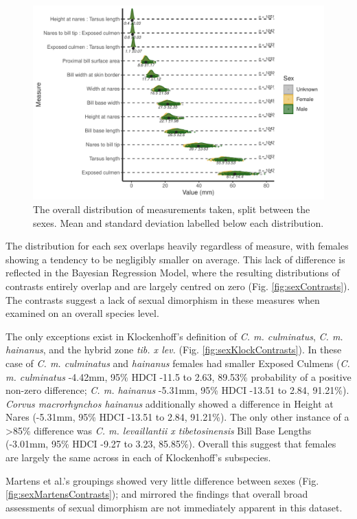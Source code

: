 \documentclass[10pt,a4paper]{article}
\begin{document}
\begin{figure}
\includegraphics[width=0.9\linewidth]{../Figures/OverallSummaryPlot} \caption{The overall distribution of measurements taken, split between the sexes. Mean and standard deviation labelled below each distribution.}\label{fig:overallPlot}
\end{figure}

The distribution for each sex overlaps heavily regardless of measure, with females showing a tendency to be negligibly smaller on average.
This lack of difference is reflected in the Bayesian Regression Model, where the resulting distributions of contrasts entirely overlap and are largely centred on zero (Fig. \ref{fig:sexContrasts}).
The contrasts suggest a lack of sexual dimorphism in these measures when examined on an overall species level.

The only exceptions exist in Klockenhoff's definition of \emph{C. m. culminatus}, \emph{C. m. hainanus}, and the hybrid zone \emph{tib. x lev.} (Fig. \ref{fig:sexKlockContrasts}).
In these case of \emph{C. m. culminatus} and \emph{hainanus} females had smaller Exposed Culmens (\emph{C. m. culminatus} -4.42mm, 95\% HDCI -11.5 to 2.63, 89.53\% probability of a positive non-zero difference; \emph{C. m. hainanus} -5.31mm, 95\% HDCI -13.51 to 2.84, 91.21\%).
\emph{Corvus macrorhynchos hainanus} additionally showed a difference in Height at Nares (-5.31mm, 95\% HDCI -13.51 to 2.84, 91.21\%).
The only other instance of a \textgreater85\% difference was \emph{C. m. levaillantii x tibetosinensis} Bill Base Lengths (-3.01mm, 95\% HDCI -9.27 to 3.23, 85.85\%).
Overall this suggest that females are largely the same across in each of Klockenhoff's subspecies.

Martens et al.'s groupings showed very little difference between sexes (Fig. \ref{fig:sexMartensContrasts}); and mirrored the findings that overall broad assessments of sexual dimorphism are not immediately apparent in this dataset.
\end{document}

